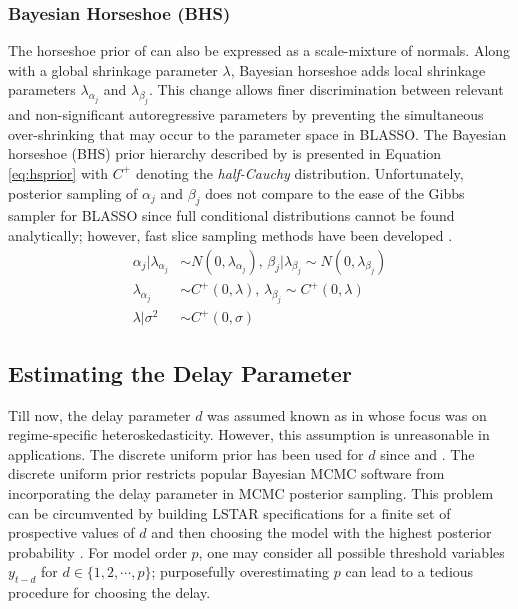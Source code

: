  \subsubsection{Bayesian Horseshoe (BHS)}
 
The horseshoe prior  of \cite{Carvalho2009} can also be expressed as a scale-mixture of normals. Along with a global shrinkage parameter $\lambda$, Bayesian horseshoe adds local shrinkage parameters $\lambda_{\alpha_j}$ and $\lambda_{\beta_j}$. This change allows finer discrimination between relevant and non-significant autoregressive parameters by preventing the simultaneous over-shrinking that may occur to the parameter space in BLASSO. The  Bayesian horseshoe (BHS) prior hierarchy described by \citep{Carvalho2010} is presented in Equation \ref{eq:hsprior} with $C^+$ denoting the \textit{half-Cauchy} distribution. Unfortunately, posterior sampling of $\alpha_j$ and $\beta_j$ does not compare to the ease of the Gibbs sampler for BLASSO since full conditional distributions cannot be found analytically; however, fast slice sampling methods have been developed \citep{Hahn2016,Hahn2018}.  
\begin{equation}
\begin{split}
	\label{eq:hsprior}
	\alpha_j|\lambda_{\alpha_j} & \sim N(0,\lambda_{\alpha_j}) \textrm{,  }  \beta_j|\lambda_{\beta_j} \sim N(0,\lambda_{\beta_j}) \\
	  \lambda_{\alpha_j} & \sim C^+(0,\lambda) \textrm{,  } \lambda_{\beta_j} \sim C^+(0,\lambda) \\
	  \lambda|\sigma^2 & \sim C^+(0,\sigma)
\end{split}
\end{equation}

\subsection{Estimating the Delay Parameter}

Till now, the delay parameter $d$ was assumed known as in \cite{Gerlach2008} whose focus was on regime-specific heteroskedasticity. However, this assumption is unreasonable in applications. The discrete uniform prior has been used for $d$ since \cite{Lubrano2000} and \cite{Lopes2006}. The discrete uniform prior restricts popular Bayesian MCMC software from incorporating the delay parameter in MCMC posterior sampling. This problem can be circumvented by building LSTAR specifications for a finite set of prospective values of $d$ and then choosing the model with the highest posterior probability \citep{Deschamps2008}. For model order $p$, one may consider all possible threshold variables $y_{t-d}$ for $d \in \{1,2, \cdots, p\}$; purposefully overestimating $p$ can lead to a tedious procedure for choosing the delay. 

